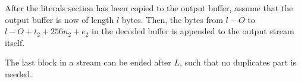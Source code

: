 \documentclass[11pt,a4paper]{report}
\begin{document}
        After the literals section has been copied to the output buffer, assume
        that the output buffer is now of length $l$ bytes. Then, the bytes from
        $l - O$ to $l - O + t_2 + 256n_2 + e_2$ in the decoded buffer is
        appended to the output stream itself.

        The last block in a stream can be ended after $L$, such that no
        duplicates part is needed.
\end{document}
